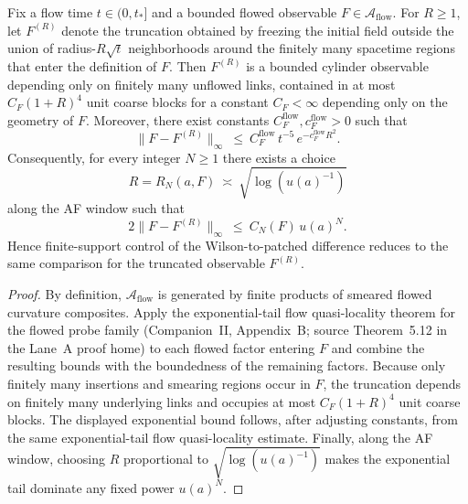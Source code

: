 \begin{lemma}\label{lem:flow_to_depatch_bridge}
Fix a flow time $t\in(0,t_\ast]$ and a bounded flowed observable $F\in\mathcal A_{\mathrm{flow}}$.
For $R\ge 1$, let $F^{(R)}$ denote the truncation obtained by freezing the initial field outside the union of radius-$R\sqrt t$ neighborhoods around the finitely many spacetime regions that enter the definition of $F$.
Then $F^{(R)}$ is a bounded cylinder observable depending only on finitely many unflowed links, contained in at most $C_F(1+R)^4$ unit coarse blocks for a constant $C_F<\infty$ depending only on the geometry of $F$.
Moreover, there exist constants $C_F^{\mathrm{flow}},c_F^{\mathrm{flow}}>0$ such that
\[
\|F-F^{(R)}\|_\infty \ \le\ C_F^{\mathrm{flow}}\, t^{-5}\,e^{-c_F^{\mathrm{flow}}R^2}.
\]
Consequently, for every integer $N\ge 1$ there exists a choice
\[
R=R_N(a,F)\ \asymp\ \sqrt{\log(u(a)^{-1})}
\]
along the AF window such that
\[
2\|F-F^{(R)}\|_\infty\ \le\ C_N(F)\,u(a)^N.
\]
Hence finite-support control of the Wilson-to-patched difference reduces to the same comparison for the truncated observable $F^{(R)}$.
\end{lemma}

\begin{proof}
By definition, $\mathcal A_{\mathrm{flow}}$ is generated by finite products of smeared flowed curvature composites.
Apply the exponential-tail flow quasi-locality theorem for the flowed probe family (Companion~II, Appendix~B; source Theorem~5.12 in the Lane~A proof home) to each flowed factor entering $F$ and combine the resulting bounds with the boundedness of the remaining factors.
Because only finitely many insertions and smearing regions occur in $F$, the truncation depends on finitely many underlying links and occupies at most $C_F(1+R)^4$ unit coarse blocks.
The displayed exponential bound follows, after adjusting constants, from the same exponential-tail flow quasi-locality estimate.
Finally, along the AF window, choosing $R$ proportional to $\sqrt{\log(u(a)^{-1})}$ makes the exponential tail dominate any fixed power $u(a)^N$.
\end{proof}

